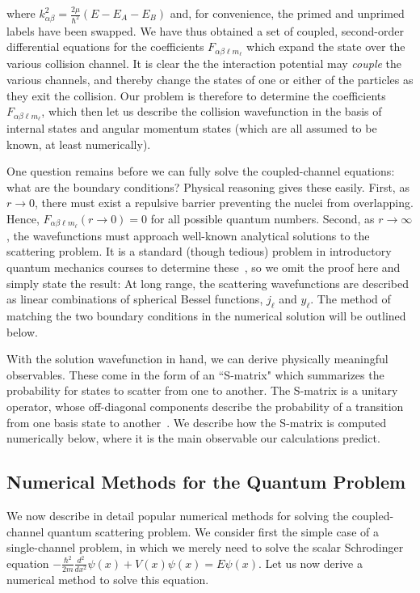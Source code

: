 \documentclass[%
 reprint,
 amsmath,amssymb,
 aps,
 nofootinbib
]{revtex4-1}
\begin{document}
\noindent where $k_{\alpha \beta}^2 = \frac{2\mu}{\hbar^2}(E-E_A-E_B)$ and, for convenience, the primed and unprimed labels have been swapped. We have thus obtained a set of coupled, second-order differential equations for the coefficients $F_{\alpha \beta \ell m_\ell}$ which expand the state over the various collision channel. It is clear the the interaction potential may \textit{couple} the various channels, and thereby change the states of one or either of the particles as they exit the collision. Our problem is therefore to determine the coefficients $F_{\alpha \beta \ell m_\ell}$, which then let us describe the collision wavefunction in the basis of internal states and angular momentum states (which are all assumed to be known, at least numerically). 

One question remains before we can fully solve the coupled-channel equations: what are the boundary conditions? Physical reasoning gives these easily. First, as $r \rightarrow 0$, there must exist a repulsive barrier preventing the nuclei from overlapping. Hence, $F_{\alpha \beta \ell m_\ell}(r\rightarrow 0) = 0$ for all possible quantum numbers. Second, as $r \rightarrow \infty$, the wavefunctions must approach well-known analytical solutions to the scattering problem. It is a standard (though tedious) problem in introductory quantum mechanics courses to determine these~\cite{Krems2017,ColdChemBook}, so we omit the proof here and simply state the result: At long range, the scattering wavefunctions are described as linear combinations of spherical Bessel functions, $j_\ell$ and $y_\ell$. The method of matching the two boundary conditions in the numerical solution will be outlined below.

With the solution wavefunction in hand, we can derive physically meaningful observables. These come in the form of an ``S-matrix" which summarizes the probability for states to scatter from one to another. The S-matrix is a unitary operator, whose off-diagonal components describe the probability of a transition from one basis state to another~\cite{Krems2017,ColdMolsBook,ColdChemBook}. We describe how the S-matrix is computed numerically below, where it is the main observable our calculations predict.

\subsection{\label{sec:QuantumMethod} Numerical Methods for the Quantum Problem}
We now describe in detail popular numerical methods for solving the coupled-channel quantum scattering problem. We consider first the simple case of a single-channel problem, in which we merely need to solve the scalar Schrodinger equation $-\frac{\hbar^2}{2m} \frac{d^2}{dx^2} \psi(x) + V(x) \psi(x) = E \psi(x)$. Let us now derive a numerical method to solve this equation. 
\end{document}
